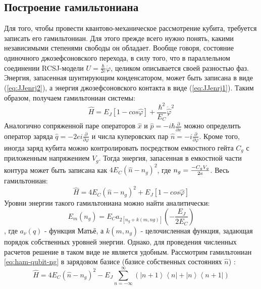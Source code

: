 \documentclass[12pt, twoside]{report}
\numberwithin{equation}{section}
\numberwithin{figure}{section}
\begin{document}
\subsection{Построение гамильтониана}
Для того, чтобы провести квантово-механическое рассмотрение кубита, требуется записать его гамильтониан. Для этого прежде всего нужно понять, какими независимыми степенями свободы он обладает. Вообще говоря, состояние одиночного джозефсоновского перехода, в силу того, что в параллельном соединении RCSJ-модели $U = \frac{\hbar}{2e}\dot\varphi$, целиком описывается своей разностью фаз. Энергия, запасенная шунтирующим конденсатором, может быть записана в виде (\ref{eq:JJenrj2}), а энергия джозефсоновского контакта в виде (\ref{eq:JJenrj1}). Таким образом, получаем гамильтониан системы:
\begin{equation}
\hat{H} = E_J \left[ 1 - cos\hat{\varphi} \right] + \frac{ \hbar^2 }{  E_C } \dot{\hat{\varphi}}^2
\label{eq:ham-qubit}
\end{equation}
Аналогично сопряженной паре операторов $\hat{x}$ и $\hat{p} = -i\hbar\frac{\partial}{\partial x }$ можно определить оператор заряда $\hat{q} = -2e i  \frac{\partial}{\partial \varphi }$ и числа куперовских пар $\hat{n} = - i \frac{\partial}{\partial \varphi }$. Кроме того, иногда заряд кубита можно контролировать посредством емкостного гейта $C_g$ с приложенным напряжением $V_g$. Тогда энергия, запасенная в емкостной части контура может быть записана как $4 E_C (\hat{n} - n_g )^2 $, где $n_g = {-C_g V_g \over 2e}$. Весь гамильтониан:
\begin{equation}
\hat{H} = 4 E_C (\hat{n} - n_g )^2 + E_J \left[1 - cos\hat{\varphi}\right]
\label{eq:ham-qubit-ng}
\end{equation}
Уровни энергии такого гамильтониана можно найти аналитически:
\begin{equation}
E_m(n_g) = E_C a_{2 \left[n_g+k\left(m,ng\right)\right]} (-\frac{E_J}{2 E_C})
\label{eq:ham-qubit-ng-anal}
\end{equation},
где $a_\nu(q)$ - функция Матьё, а $k(m,n_g)$ - целочисленная функция, задающая порядок собственных уровней энергии. Однако, для проведения численных расчетов решение в таком виде не является удобным. Рассмотрим гамильтониан \ref{eq:ham-qubit-ng} в зарядовом базисе (базисе собственных состояниях $\hat{n}$) :
\begin{equation}
\hat{H} = 4 E_C \left(\hat{n} - n_g\right)^2  - E_J \sum_{n = -\infty}^{\infty}
\left( 
\left|n+1 \right>\left<n   \right| +
\left|n   \right>\left<n+1 \right|
\right)
\label{eq:ham-qubit-charge-basis}
\end{equation}
\end{document}
